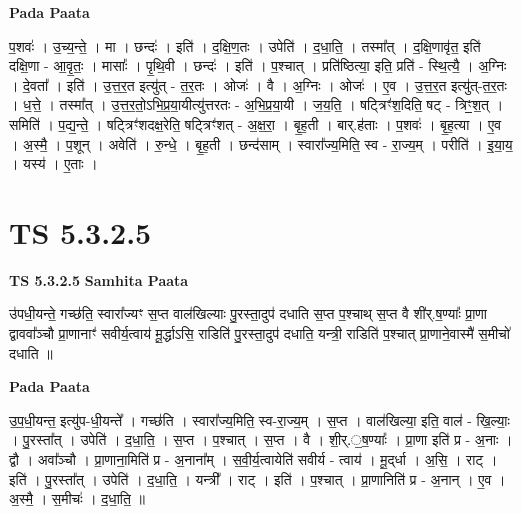 \documentclass[17pt]{extarticle}
\begin{document}
\textbf{Pada Paata} \newline

प॒शवः॑ । उ॒च्य॒न्ते॒ । मा । छन्दः॑ । इति॑ । द॒क्षि॒ण॒तः । उपेति॑ । द॒धा॒ति॒ । तस्मा᳚त् । द॒क्षि॒णावृ॑त॒ इति॑ दक्षि॒णा - आ॒वृ॒तः॒ । मासाः᳚ । पृ॒थि॒वी । छन्दः॑ । इति॑ । प॒श्चात् । प्रति॑ष्ठित्या॒ इति॒ प्रति॑ - स्थि॒त्यै॒ । अ॒ग्निः । दे॒वता᳚ । इति॑ । उ॒त्त॒र॒त इत्यु॑त् - त॒र॒तः । ओजः॑ । वै । अ॒ग्निः । ओजः॑ । ए॒व । उ॒त्त॒र॒त इत्यु॑त्-त॒र॒तः । ध॒त्ते॒ । तस्मा᳚त् । उ॒त्त॒र॒तो॒ऽभि॒प्र॒या॒यीत्यु॑त्तरतः - अ॒भि॒प्र॒या॒यी । ज॒य॒ति॒ । षट्त्रिꣳ॑श॒दिति॒ षट् - त्रिꣳ॒॒श॒त् । समिति॑ । प॒द्य॒न्ते॒ । षट्त्रिꣳ॑शदक्ष॒रेति॒ षट्त्रिꣳ॑शत् -   अ॒क्ष॒रा॒ । बृ॒ह॒ती । बार्.ह॑ताः । प॒शवः॑ । बृ॒ह॒त्या । ए॒व । अ॒स्मै॒ । प॒शून् । अवेति॑ । रु॒न्धे॒ । बृ॒ह॒ती । छन्द॑साम् । स्वारा᳚ज्य॒मिति॒ स्व - रा॒ज्य॒म् । परीति॑ । इ॒या॒य॒ । यस्य॑ । ए॒ताः ।  \newline





\section{ TS 5.3.2.5 }

\textbf{TS 5.3.2.5 } \newline
\textbf{Samhita Paata} \newline

उ॑पधी॒यन्ते॒ गच्छ॑ति॒ स्वारा᳚ज्यꣳ स॒प्त वाल॑खिल्याः पु॒रस्ता॒दुप॑ दधाति स॒प्त प॒श्चाथ् स॒प्त वै शी॑र्.ष॒ण्याः᳚ प्रा॒णा द्वाववा᳚ञ्चौ प्रा॒णानाꣳ॑ सवीर्य॒त्वाय॑ मू॒र्द्धाऽसि॒ राडिति॑ पु॒रस्ता॒दुप॑ दधाति॒ यन्त्री॒ राडिति॑ प॒श्चात् प्रा॒णाने॒वास्मै॑ स॒मीचो॑ दधाति ॥ \newline

\textbf{Pada Paata} \newline

उ॒प॒धी॒यन्त॒ इत्यु॑प-धी॒यन्ते᳚ । गच्छ॑ति । स्वारा᳚ज्य॒मिति॒ स्व-रा॒ज्य॒म् । स॒प्त । वाल॑खिल्या॒ इति॒ वाल॑ - खि॒ल्याः॒ । पु॒रस्ता᳚त् । उपेति॑ । द॒धा॒ति॒ । स॒प्त । प॒श्चात् । स॒प्त । वै । शी॒र्.॒ष॒ण्याः᳚ । प्रा॒णा इति॑ प्र - अ॒नाः । द्वौ । अवा᳚ञ्चौ । प्रा॒णाना॒मिति॑ प्र - अ॒नाना᳚म् । स॒वी॒र्य॒त्वायेति॑ सवीर्य - त्वाय॑ । मू॒द्‌र्धा । अ॒सि॒ । राट् । इति॑ । पु॒रस्ता᳚त् । उपेति॑ । द॒धा॒ति॒ । यन्त्री᳚ । राट् । इति॑ । प॒श्चात् । प्रा॒णानिति॑ प्र - अ॒नान् । ए॒व । अ॒स्मै॒ । स॒मीचः॑ । द॒धा॒ति॒ ॥  \newline




\end{document}
